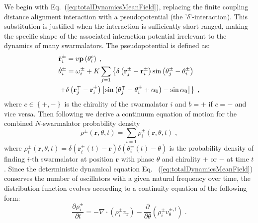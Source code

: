 \documentclass{article}
\begin{document}
We begin with Eq.~(\ref{eq:totalDynamicsMeanField}), replacing the finite coupling distance alignment interaction with a pseudopotential (the '$\delta$'-interaction). This substitution is justified when the interaction is sufficiently short-ranged, making the specific shape of the associated interaction potential irrelevant to the dynamics of many swarmalators. The pseudopotential is defined as:
\begin{subequations}
    \begin{align}
        &\dot{\mathbf{r}}_{i}^{\pm}=v\mathbf{p}\left( \theta _{i}^{c} \right) \;,\\
        &\dot{\theta}_{i}^{\pm}=\omega _{i}^{\pm}+K\sum_{j=1}{\left\{ \delta \left( \mathbf{r}_{j}^{\pm}-\mathbf{r}_{i}^{\pm} \right) \sin \left( \theta _{j}^{\pm}-\theta _{i}^{\pm} \right) \right.}\notag\\
        &\left. +\delta \left( \mathbf{r}_{j}^{\mp}-\mathbf{r}_{i}^{\pm} \right) \left[ \sin \left( \theta _{j}^{\mp}-\theta _{i}^{\pm}+\alpha _0 \right) -\sin \alpha _0 \right] \right\} \;,
    \end{align}
\end{subequations}
where $c\in\left\{+,-\right\}$ is the chirality of the swarmalator $i$ and $b=+$ if $c=-$ and vice versa.  
Then following \cite{David_S_Dean_1996} we derive a continuum equation of motion for the combined $N$-swarmalator probability density
\begin{equation}
    \label{eq:globalContinuityDef}
    \rho ^{\pm}\left( \mathbf{r},\theta ,t \right) =\sum_{i=1}{\rho _{i}^{\pm}\left( \mathbf{r},\theta ,t \right)}\;,
\end{equation}
where $\rho _{i}^{\pm}\left( \mathbf{r},\theta ,t \right) =\delta \left( \mathbf{r}_{i}^{\pm}\left( t \right) -\mathbf{r} \right) \delta \left( \theta _{i}^{\pm}\left( t \right) -\theta \right)$ is the probability density of finding $i$-th swarmalator at position $\mathbf{r}$ with phase $\theta$ and chirality $+$ or $-$ at time $t$.
Since the deterministic dynamical equation Eq.~ (\ref{eq:totalDynamicsMeanField}) conserves the number of oscillators with a given natural frequency over time, the distribution function evolves according to a continuity equation of the following form:
\begin{equation}
    \frac{\partial \rho _{i}^{\pm}}{\partial t}=-\nabla \cdot \left( \rho _{i}^{\pm}v_{\mathbf{r}} \right) -\frac{\partial}{\partial \theta}\left( \rho _{i}^{\pm}v_{\theta}^{\pm ,i} \right) \;.
    \label{eq:singleContinuity}
\end{equation}
\end{document}
